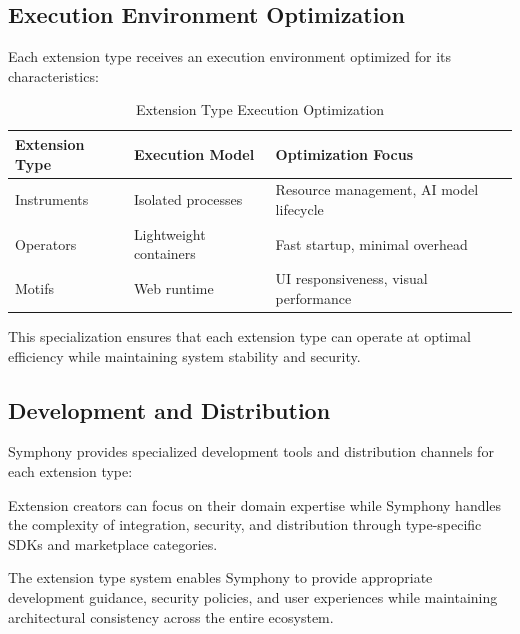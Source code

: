 \subsection*{Execution Environment Optimization}

Each extension type receives an execution environment optimized for its characteristics:

\begin{table}[ht]
\centering
\begin{tabular}{@{}lll@{}}
\toprule
\textbf{Extension Type} & \textbf{Execution Model} & \textbf{Optimization Focus} \\
\midrule
Instruments & Isolated processes & Resource management, AI model lifecycle \\
Operators & Lightweight containers & Fast startup, minimal overhead \\
Motifs & Web runtime & UI responsiveness, visual performance \\
\bottomrule
\end{tabular}
\caption{Extension Type Execution Optimization}
\end{table}

This specialization ensures that each extension type can operate at optimal efficiency while maintaining system stability and security.

\subsection*{Development and Distribution}

Symphony provides specialized development tools and distribution channels for each extension type:

\begin{alertbox}
Extension creators can focus on their domain expertise while Symphony handles the complexity of integration, security, and distribution through type-specific SDKs and marketplace categories.
\end{alertbox}

The extension type system enables Symphony to provide appropriate development guidance, security policies, and user experiences while maintaining architectural consistency across the entire ecosystem.
